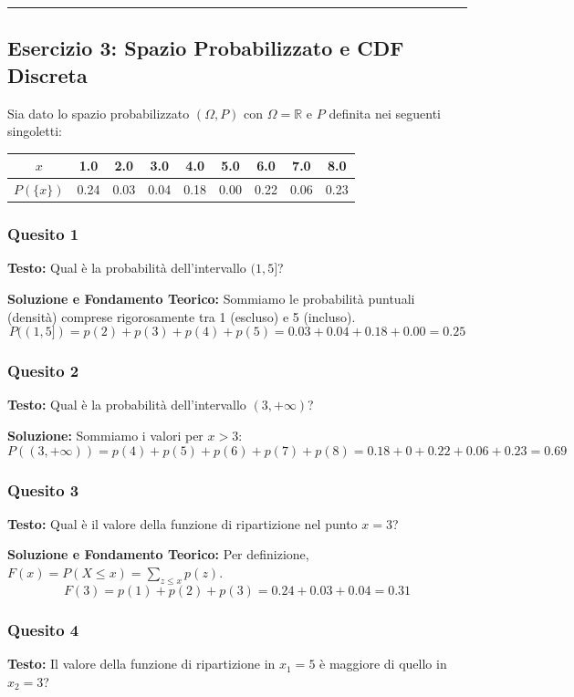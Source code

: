 \documentclass[12pt, a4paper]{article}
\begin{document}
\vspace{0.5cm}\hrule\vspace{0.5cm}

\subsection*{Esercizio 3: Spazio Probabilizzato e CDF Discreta}
Sia dato lo spazio probabilizzato $(\Omega, P)$ con $\Omega = \mathbb{R}$ e $P$ definita nei seguenti singoletti:
\begin{center}
\begin{tabular}{c|cccccccc}
\toprule
$x$ & 1.0 & 2.0 & 3.0 & 4.0 & 5.0 & 6.0 & 7.0 & 8.0 \\
\midrule
$P(\{x\})$ & 0.24 & 0.03 & 0.04 & 0.18 & 0.00 & 0.22 & 0.06 & 0.23 \\
\bottomrule
\end{tabular}
\end{center}

\subsubsection*{Quesito 1}
\textbf{Testo:} Qual è la probabilità dell'intervallo $(1, 5]$?

\textbf{Soluzione e Fondamento Teorico:} 
Sommiamo le probabilità puntuali (densità) comprese rigorosamente tra 1 (escluso) e 5 (incluso).
$$ P((1, 5]) = p(2) + p(3) + p(4) + p(5) = 0.03 + 0.04 + 0.18 + 0.00 = 0.25 $$

\subsubsection*{Quesito 2}
\textbf{Testo:} Qual è la probabilità dell'intervallo $(3, +\infty)$?

\textbf{Soluzione:}
Sommiamo i valori per $x > 3$:
$$ P((3, +\infty)) = p(4) + p(5) + p(6) + p(7) + p(8) = 0.18 + 0 + 0.22 + 0.06 + 0.23 = 0.69 $$

\subsubsection*{Quesito 3}
\textbf{Testo:} Qual è il valore della funzione di ripartizione nel punto $x=3$?

\textbf{Soluzione e Fondamento Teorico:} 
Per definizione, $F(x) = P(X \le x) = \sum_{z \le x} p(z)$.
$$ F(3) = p(1) + p(2) + p(3) = 0.24 + 0.03 + 0.04 = 0.31 $$

\subsubsection*{Quesito 4}
\textbf{Testo:} Il valore della funzione di ripartizione in $x_1 = 5$ è maggiore di quello in $x_2 = 3$?
\end{document}
